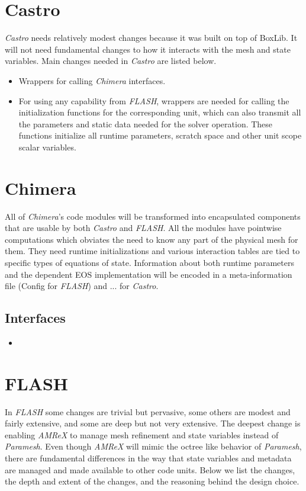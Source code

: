 \documentclass{article}
\newcommand{\flash}{{\it FLASH}\xspace}
\newcommand{\amrex}{{\it AMReX}\xspace}
\newcommand{\paramesh}{{\it Paramesh}\xspace}
\newcommand{\castro}{{\it Castro}\xspace}
\newcommand{\chimera}{{\it Chimera}\xspace}
\begin{document}
\section{Castro}
\label{sec:castro}
\castro needs relatively modest changes because it was built on top
of BoxLib. It will not need fundamental
changes to how it interacts with the mesh and state variables. Main
changes needed in \castro are listed below.
\begin{itemize}
\item Wrappers for calling \chimera  interfaces.
\item For using any capability from \flash,  wrappers are needed for
calling the initialization functions for the corresponding unit,
which can also transmit all the parameters and static data needed for
the solver operation. These functions initialize all runtime parameters, 
scratch space and other unit scope scalar variables.
\end{itemize}

\section{Chimera}
All of \chimera's code modules will be transformed into encapsulated
components that are usable by both \castro and \flash. All the modules
have pointwise computations which obviates the need to know any part of
the physical mesh for them. They need runtime initializations and
various interaction tables are tied to specific types of equations of
state. Information about both runtime parameters and the dependent EOS
implementation will be encoded in a meta-information file (Config for
\flash) and ... for \castro.
\subsection{Interfaces}
\label{sec:chimera-interfaces}
\begin{itemize}
\item
\end{itemize}

\section{FLASH}
\label{sec:flash}
 In \flash some changes are trivial but pervasive, some others are
modest and fairly extensive, and some are deep but not very
extensive. The deepest change is enabling \amrex to manage mesh
refinement and state variables instead of \paramesh. Even though
\amrex will mimic the octree like behavior of \paramesh, there are
fundamental differences in the way that state variables and metadata
are managed and made available to other code units. Below we list the
changes, the depth and extent of the changes, and the reasoning behind
the design choice.
\end{document}
